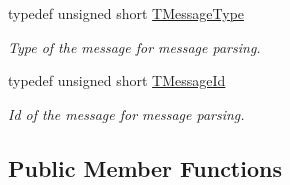 \begin{DoxyCompactItemize}
typedef unsigned short \hyperlink{class_terra_swarm_1_1_message_header_a6eaf3733d65fa5eaac0c223da4f5670c}{T\-Message\-Type}
\begin{DoxyCompactList}\small\item\em Type of the message for message parsing. \end{DoxyCompactList}\item 
typedef unsigned short \hyperlink{class_terra_swarm_1_1_message_header_acc3ebce9679077b0e438532be7c7bf6d}{T\-Message\-Id}
\begin{DoxyCompactList}\small\item\em Id of the message for message parsing. \end{DoxyCompactList}\end{DoxyCompactItemize}
\subsection*{Public Member Functions}
